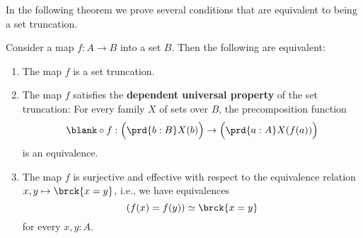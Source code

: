 In the following theorem we prove several conditions that are equivalent to being a set truncation.

\begin{thm}\label{thm:set-truncation}
  Consider a map $f:A\to B$ into a set $B$. Then the following are equivalent:
  \begin{enumerate}
  \item\label{item:is-set-truncation} The map $f$ is a set truncation.
  \item\label{item:dup-set-truncation} The map $f$ satisfies the \textbf{dependent universal property} of the set truncation: For every family $X$ of sets over $B$, the precomposition function
    \begin{equation*}
      \blank\circ f : \Big(\prd{b:B}X(b)\Big)\to\Big(\prd{a:A}X(f(a))\Big)
    \end{equation*}
    is an equivalence.
  \item\label{item:is-quotient-set-truncation} The map $f$ is surjective and effective with respect to the equivalence relation $x,y\mapsto\brck{x=y}$, i.e., we have equivalences
    \begin{equation*}
      (f(x)=f(y))\simeq \brck{x=y}
    \end{equation*}
    for every $x,y:A$.
  \end{enumerate}
\end{thm}

